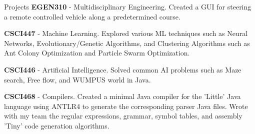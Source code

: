 \documentclass{resume} %
\begin{document}
\begin{rSection}{Projects}
\textbf{EGEN310} - Multidisciplinary Engineering. Created a GUI for steering a remote controlled vehicle along a predetermined course.

\textbf{CSCI447} - Machine Learning. Explored various ML techniques such as Neural Networks, Evolutionary/Genetic Algorithms, and Clustering Algorithms such as Ant Colony Optimization and Particle Swarm Optimization.

\textbf{CSCI446} - Artificial Intelligence. Solved common AI problems such as Maze search, Free flow, and WUMPUS world in Java.

\textbf{CSCI468} - Compilers. Created a minimal Java compiler for the 'Little' Java language using ANTLR4 to generate the corresponding parser Java files. Wrote with my team the regular expressions, grammar, symbol tables, and assembly 'Tiny' code generation algorithms.
\end{rSection}
\fi
\end{document}
